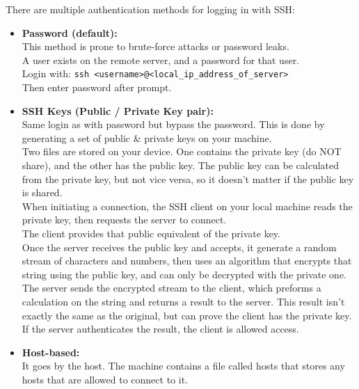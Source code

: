 \documentclass[a4paper, 10pt]{article}
\begin{document}
                There are multiple authentication methods for logging in with SSH: 
                \begin{itemize}
                \item \textbf{Password (default):}\\
                    This method is prone to brute-force attacks or password leaks.\\
                    
                    A user exists on the remote server, and a password for that user.\\
                    Login with: \texttt{ssh <username>@<local\_ip\_address\_of\_server>} \\
                    Then enter password after prompt.\\ 
                
                \item \textbf{SSH Keys (Public / Private Key pair):}\\
                Same login as with password but bypass the password. This is done by generating a set of public & private keys on your machine.\\

                    Two files are stored on your device. One contains the private key (do NOT share), and the other has the public key. The public key can be calculated from the private key, but not vice versa, so it doesn't matter if the public key is shared.\\

                    When initiating a connection, the SSH client on your local machine reads the private key, then requests the server to connect.\\ 
                    The client provides that public equivalent of the private key. \\
                    Once the server receives the public key and accepts, it generate a random stream of characters and numbers, then uses an algorithm that encrypts that string using the public key, and can only be decrypted with the private one. \\  

                    The server sends the encrypted stream to the client, which preforms a calculation on the string and returns a result to the server. This result isn't exactly the same as the original, but can prove the client has the private key. \\

                    If the server authenticates the result, the client is allowed access.      
                    
                
                \item \textbf{Host-based:} \\
                    It goes by the host. The machine contains a file called hosts that stores any hosts that are allowed to connect to it.\\
                \end{itemize}                
\end{document}
